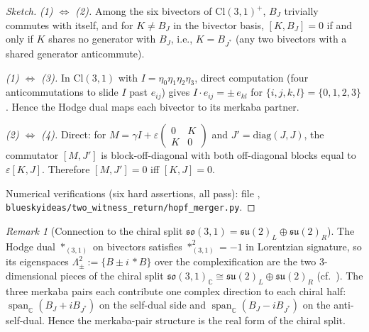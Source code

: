 \documentclass[11pt,a4paper]{article}
\theoremstyle{plain}
\theoremstyle{definition}
\theoremstyle{remark}
\newtheorem{remark}[theorem]{Remark}
\numberwithin{equation}{section}
\providecommand{\Cl}{\mathrm{Cl}}
\providecommand{\C}{\mathbb{C}}
\providecommand{\fk}[1]{\mathfrak{#1}}
\providecommand{\sogo}{\mathfrak{so}}
\providecommand{\eb}[1]{e_{#1}}
\DeclareMathOperator{\spn}{span}
\begin{document}
\begin{proof}[Sketch]
\textit{(1) $\Leftrightarrow$ (2).}  Among the six bivectors of
$\Cl(3,1)^+$, $B_J$ trivially commutes with itself, and for
$K \neq B_J$ in the bivector basis, $[K, B_J] = 0$ if and only if
$K$ shares no generator with $B_J$, i.e., $K = B_{J^*}$ (any two
bivectors with a shared generator anticommute).

\textit{(1) $\Leftrightarrow$ (3).}  In $\Cl(3,1)$ with
$I = \eta_0\eta_1\eta_2\eta_3$, direct computation (four
anticommutations to slide $I$ past $\eb{ij}$) gives $I \cdot
\eb{ij} = \pm\, \eb{kl}$ for $\{i,j,k,l\} = \{0,1,2,3\}$.  Hence
the Hodge dual maps each bivector to its merkaba partner.

\textit{(2) $\Leftrightarrow$ (4).}  Direct: for
$M = \gamma I + \varepsilon\begin{pmatrix}0 & K\\ K & 0
\end{pmatrix}$ and $J' = \mathrm{diag}(J, J)$, the commutator
$[M, J']$ is block-off-diagonal with both off-diagonal blocks
equal to $\varepsilon[K, J]$.  Therefore $[M, J'] = 0$ iff
$[K, J] = 0$.

Numerical verifications (six hard assertions, all pass): file
\cite{two-witness-return},
\texttt{blueskyideas/two\_witness\_return/hopf\_merger.py}.
\end{proof}

\begin{remark}[Connection to the chiral split
$\sogo(3,1) = \fk{su}(2)_L \oplus \fk{su}(2)_R$]
\label{rmk:chiral-split-merkaba}
The Hodge dual $*_{(3,1)}$ on bivectors satisfies
$*_{(3,1)}^2 = -1$ in Lorentzian signature, so its eigenspaces
$\Lambda^2_\pm := \{B \pm i\, *B\}$ over the complexification
are the two $3$-dimensional pieces of the chiral split
$\sogo(3,1)_\C \cong \fk{su}(2)_L \oplus \fk{su}(2)_R$ (cf.\
\cite[Rmk.~9.4]{echo-rh}).  The three merkaba pairs each
contribute one complex direction to each chiral half:
$\spn_\C(B_J + i B_{J^*})$ on the self-dual side and
$\spn_\C(B_J - i B_{J^*})$ on the anti-self-dual.  Hence the
merkaba-pair structure is the real form of the chiral split.
\end{remark}
\end{document}
